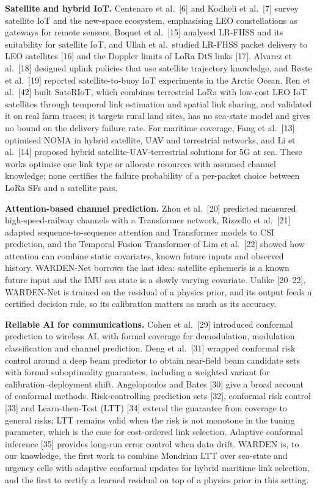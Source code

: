 \documentclass[
  11pt,
]{article}
\begin{document}
\textbf{Satellite and hybrid IoT.} Centenaro et al.~{[}6{]} and Kodheli
et al.~{[}7{]} survey satellite IoT and the new-space ecosystem,
emphasising LEO constellations as gateways for remote sensors. Boquet et
al.~{[}15{]} analysed LR-FHSS and its suitability for satellite IoT, and
Ullah et al.~studied LR-FHSS packet delivery to LEO satellites {[}16{]}
and the Doppler limits of LoRa DtS links {[}17{]}. Alvarez et
al.~{[}18{]} designed uplink policies that use satellite trajectory
knowledge, and Røste et al.~{[}19{]} reported satellite-to-buoy IoT
experiments in the Arctic Ocean. Ren et al.~{[}42{]} built SateRIoT,
which combines terrestrial LoRa with low-cost LEO IoT satellites through
temporal link estimation and spatial link sharing, and validated it on
real farm traces; it targets rural land sites, has no sea-state model
and gives no bound on the delivery failure rate. For maritime coverage,
Fang et al.~{[}13{]} optimised NOMA in hybrid satellite, UAV and
terrestrial networks, and Li et al.~{[}14{]} proposed hybrid
satellite-UAV-terrestrial solutions for 5G at sea. These works optimise
one link type or allocate resources with assumed channel knowledge; none
certifies the failure probability of a per-packet choice between LoRa
SFs and a satellite pass.

\textbf{Attention-based channel prediction.} Zhou et al.~{[}20{]}
predicted measured high-speed-railway channels with a Transformer
network, Rizzello et al.~{[}21{]} adapted sequence-to-sequence attention
and Transformer models to CSI prediction, and the Temporal Fusion
Transformer of Lim et al.~{[}22{]} showed how attention can combine
static covariates, known future inputs and observed history. WARDEN-Net
borrows the last idea: satellite ephemeris is a known future input and
the IMU sea state is a slowly varying covariate. Unlike {[}20--22{]},
WARDEN-Net is trained on the residual of a physics prior, and its output
feeds a certified decision rule, so its calibration matters as much as
its accuracy.

\textbf{Reliable AI for communications.} Cohen et al.~{[}29{]}
introduced conformal prediction to wireless AI, with formal coverage for
demodulation, modulation classification and channel prediction. Deng et
al.~{[}31{]} wrapped conformal risk control around a deep beam predictor
to obtain near-field beam candidate sets with formal suboptimality
guarantees, including a weighted variant for calibration--deployment
shift. Angelopoulos and Bates {[}30{]} give a broad account of conformal
methods. Risk-controlling prediction sets {[}32{]}, conformal risk
control {[}33{]} and Learn-then-Test (LTT) {[}34{]} extend the guarantee
from coverage to general risks; LTT remains valid when the risk is not
monotone in the tuning parameter, which is the case for cost-ordered
link selection. Adaptive conformal inference {[}35{]} provides long-run
error control when data drift. WARDEN is, to our knowledge, the first
work to combine Mondrian LTT over sea-state and urgency cells with
adaptive conformal updates for hybrid maritime link selection, and the
first to certify a learned residual on top of a physics prior in this
setting.
\end{document}
